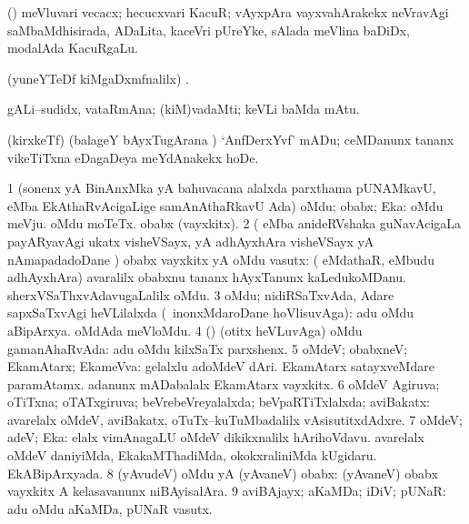 \bentry
{}
\gl{\nA}
\bmng
(\birx) meVluvari vecacx; hecucxvari KacuR; vAyxpAra vayxvahArakekx neVravAgi saMbaMdhisirada, ADaLita, kaceVri pUreYke, sAlada meVlina baDiDx, modalAda KacuRgaLu. 
\emng
\eentry

\bentry
{}
\gl{\saMkiSx}
\bmng
(yuneYTeDf kiMgaDxmfnalilx) . 
\emng
\eentry

\bentry
{}
\gl{\nA}
\bmng
gALi--sudidx, vataRmAna; (kiM)vadaMti; keVLi baMda mAtu. 
\emng
\eentry

\bentry
{}
\gl{\sakirx}
\bmng
(kirxkeTf) (balageY bAyxTugArana \vi) `AnfDerxYvf' mADu; ceMDanunx tananx vikeTiTxna eDagaDeya meYdAnakekx hoDe. 
\emng
\eentry

\bentry
{}
\gl{\gu}
\bmng
\bnum
\num{1} (sonenx yA BinAnxMka yA bahuvacana alalxda parxthama pUNAMkavU,  eMba EkAthaRvAcigaLige samAnAthaRkavU Ada) oMdu; obabx; Eka:  oMdu meVju.  oMdu moTeTx.  obabx (vayxkitx). 
\num{2} ( eMba anideRVshaka guNavAcigaLa payARyavAgi ukatx visheVSayx, yA adhAyxhAra visheVSayx yA nAmapadadoDane \parx) obabx vayxkitx yA oMdu vasutx:  ( eMdathaR,  eMbudu adhAyxhAra) avaralilx obabxnu tananx hAyxTanunx kaLedukoMDanu.  sherxVSaThxvAdavugaLalilx oMdu. 
\num{3} oMdu; nidiRSaTxvAda, Adare sapxSaTxvAgi heVLilalxda (\kanmu\ inonxMdaroDane hoVlisuvAga):  adu oMdu aBipArxya.  oMdAda meVloMdu. 
\num{4} (\AmA) (otitx heVLuvAga) oMdu gamanAhaRvAda:  adu oMdu kilxSaTx parxshenx. 
\num{5} oMdeV; obabxneV; EkamAtarx; EkameVva:  gelalxlu adoMdeV dAri.  EkamAtarx satayxveMdare paramAtamx.  adanunx mADabalalx EkamAtarx vayxkitx. 
\num{6} oMdeV Agiruva; oTiTxna; oTATxgiruva; beVrebeVreyalalxda; beVpaRTiTxlalxda; aviBakatx:  avarelalx oMdeV, aviBakatx, oTuTx--kuTuMbadalilx vAsisutitxdAdxre. 
\num{7} oMdeV; adeV; Eka:  elalx vimAnagaLU oMdeV dikikxnalilx hArihoVdavu.  avarelalx oMdeV daniyiMda, EkakaMThadiMda, okokxraliniMda kUgidaru.  EkABipArxyada. 
\num{8} (yAvudeV) oMdu yA (yAvaneV) obabx:  (yAvaneV) obabx vayxkitx A kelasavanunx niBAyisalAra. 
\num{9} aviBAjayx; aKaMDa; iDiV; pUNaR:  adu oMdu aKaMDa, pUNaR vasutx. 
\enum
\emng

